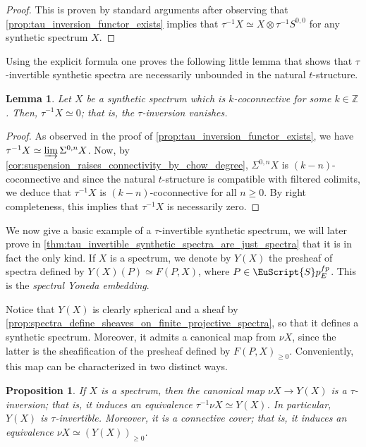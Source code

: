 \documentclass[oneside,a4paper]{amsart}
\newcommand{\euscr}[1]{\EuScript{#1}} %
\newcommand{\spectra}{\euscr{S}p} %
\theoremstyle{plain}
\newtheorem{lemma}[thm]{Lemma}
\newtheorem{prop}[thm]{Proposition}
\theoremstyle{definition}
\theoremstyle{remark}
\begin{document}
\begin{proof}
This is proven by standard arguments after observing that \cref{prop:tau_inversion_functor_exists} implies that $\tau^{-1} X \simeq X \otimes \tau^{-1} S^{0, 0}$ for any synthetic spectrum $X$. 
\end{proof}
Using the explicit formula one proves the following little lemma that shows that $\tau$-invertible synthetic spectra are necessarily unbounded in the natural $t$-structure. 
\begin{lemma}
\label{lemma:tau_inversion_of_a_coconnective_synthetic_spectrum_vanishes}
Let $X$ be a synthetic spectrum which is $k$-coconnective for some $k \in \mathbb{Z}$. Then, $\tau^{-1} X \simeq 0$; that is, the $\tau$-inversion vanishes.
\end{lemma}

\begin{proof}
As observed in the proof of \cref{prop:tau_inversion_functor_exists}, we have $\tau^{-1} X \simeq \varinjlim \Sigma^{0, n} X$. Now, by \cref{cor:suspension_raises_connectivity_by_chow_degree}, $\Sigma^{0, n} X$ is $(k-n)$-coconnective and since the natural $t$-structure is compatible with filtered colimits, we deduce that $\tau^{-1} X$ is $(k-n)$-coconnective for all $n \geq 0$. By right completeness, this implies that $\tau^{-1} X$ is necessarily zero. 
\end{proof}
We now give a basic example of a $\tau$-invertible synthetic spectrum, we will later prove in \cref{thm:tau_invertible_synthetic_spectra_are_just_spectra} that it is in fact the only kind. If $X$ is a spectrum, we denote by $Y(X)$ the presheaf of spectra defined by $Y(X)(P) \simeq F(P, X)$, where $P \in \spectra_{E}^{fp}$. This is the \emph{spectral Yoneda embedding}. 

Notice that $Y(X)$ is clearly spherical and a sheaf by \cref{prop:spectra_define_sheaves_on_finite_projective_spectra}, so that it defines a synthetic spectrum. Moreover, it admits a canonical map from $\nu X$, since the latter is the sheafification of the presheaf defined by $F(P, X)_{\geq 0}$. Conveniently, this map can be characterized in two distinct ways.

\begin{prop}
\label{prop:spectral_yoneda_embedding_the_tau_inversion_of_the_synthetic_analogue}
If $X$ is a spectrum, then the canonical map $\nu X \rightarrow Y(X)$ is a $\tau$-inversion; that is, it induces an equivalence $\tau^{-1} \nu X \simeq Y(X)$. In particular, $Y(X)$ is $\tau$-invertible. Moreover, it is a connective cover; that is, it induces an equivalence $\nu X \simeq (Y(X))_{\geq 0}$. 
\end{prop}
\end{document}
